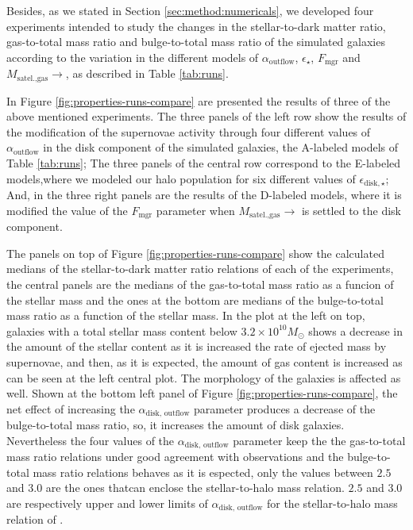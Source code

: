 \documentclass[usenatbib]{mn2e}
\begin{document}
Besides, as we stated in Section \ref{sec:method:numericals}, we
developed four experiments intended to study the changes in the
stellar-to-dark matter ratio, gas-to-total mass ratio and
bulge-to-total mass ratio of the simulated galaxies according to the
variation in the different models of $\alpha_{\text{outflow}}$,
$\epsilon_\star$, $F_{\text{mgr}}$ and  $M_{\text{satel.,gas}}\to$, as
described in  Table \ref{tab:runs}.  

In Figure \ref{fig:properties-runs-compare} are presented the results
of three of the above mentioned experiments. The three panels of the
left row show the results of the modification of the supernovae
activity through four different values of $\alpha_{\text{outflow}}$ in
the disk component of the simulated galaxies, the A-labeled models of
Table \ref{tab:runs}; The three panels of the central row correspond
to the E-labeled models,where we modeled our halo population for six
different values of $\epsilon_{\text{disk},\star}$; And, in the three
right panels are the results of the D-labeled models, where it is
modified the value of the $F_{\text{mgr}}$ parameter when
$M_{\text{satel.,gas}}\to$ is settled to the disk component.  

The panels on top of Figure \ref{fig:properties-runs-compare} show the
calculated medians of the stellar-to-dark matter ratio relations of
each of the experiments, the central panels are the medians of the
gas-to-total mass ratio as a funcion of the stellar mass and the ones
at the bottom are medians of the bulge-to-total mass ratio as a
function of the stellar mass. In the plot at the left on top, galaxies
with a total stellar mass content below $3.2\times 10^{10}M_{\odot}$
shows a decrease in the amount of the stellar content as it is
increased the rate of ejected mass by supernovae, and then, as it is
expected, the amount of gas content is increased as can be seen at the
left central plot. The morphology of the galaxies is affected as
well. Shown at the bottom left panel of Figure
\ref{fig:properties-runs-compare}, the net effect of increasing the
$\alpha_{\text{disk, outflow}}$ parameter produces a decrease of the
bulge-to-total mass ratio, so, it increases the amount of disk
galaxies. Nevertheless the four values of the $\alpha_{\text{disk,
    outflow}}$ parameter keep the the gas-to-total mass ratio
relations under good agreement with observations and the
bulge-to-total mass ratio relations behaves as it is espected, only
the values between $2.5$  and $3.0$ are the ones thatcan enclose the
stellar-to-halo mass relation. $2.5$  and $3.0$ are respectively
upper and lower limits of $\alpha_{\text{disk, outflow}}$ for the
stellar-to-halo mass relation of \cite{2010ApJ...710..903M}. 
\end{document}
